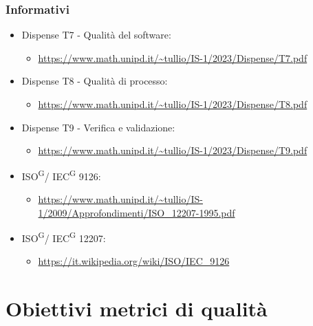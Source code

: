 \documentclass[8pt]{article}
\newcommand{\glossterm}[1]{#1\textsuperscript{G}} %
\begin{document}
\subsubsection{Informativi}
\begin{itemize}
	\item Dispense T7 - Qualità del software:
	\begin{itemize}
		\item \href{https://www.math.unipd.it/~tullio/IS-1/2023/Dispense/T7.pdf}{\color{myblue}https://www.math.unipd.it/\textasciitilde{}tullio/IS-1/2023/Dispense/T7.pdf}
	\end{itemize}
	\item Dispense T8 - Qualità di processo:
	\begin{itemize}
		\item \href{https://www.math.unipd.it/~tullio/IS-1/2023/Dispense/T8.pdf}{\color{myblue}https://www.math.unipd.it/\textasciitilde{}tullio/IS-1/2023/Dispense/T8.pdf}
	\end{itemize}
	\item Dispense T9 - Verifica e validazione:
	\begin{itemize}
		\item \href{https://www.math.unipd.it/~tullio/IS-1/2023/Dispense/T9.pdf}{\color{myblue}https://www.math.unipd.it/\textasciitilde{}tullio/IS-1/2023/Dispense/T9.pdf}
	\end{itemize}
	\item \glossterm{ISO}/ \glossterm{IEC} 9126:
	\begin{itemize}
		\item \href{https://www.math.unipd.it/~tullio/IS-1/2009/Approfondimenti/ISO_12207-1995.pdf}{\color{myblue}https://www.math.unipd.it/\textasciitilde{}tullio/IS-1/2009/Approfondimenti/ISO\_12207-1995.pdf}
	\end{itemize}
	\item \glossterm{ISO}/ \glossterm{IEC} 12207:
	\begin{itemize}
		\item \href{https://it.wikipedia.org/wiki/ISO/IEC_9126}{\color{myblue}https://it.wikipedia.org/wiki/ISO/IEC\_9126}
	\end{itemize}
\end{itemize}
\clearpage
\section{Obiettivi metrici di qualità}
\end{document}
